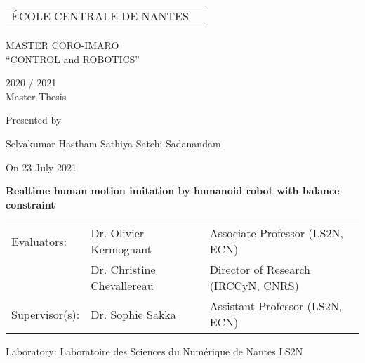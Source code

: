 \thispagestyle{empty}

\def\lskip{\vspace{0.5cm}}


\begin{tabular}{p{7cm}p{8cm}}
ÉCOLE CENTRALE DE NANTES
&
\end{tabular}

\vspace{2cm}

\begin{center} \large\sc MASTER CORO-IMARO\\ \normalsize{``CONTROL and ROBOTICS''} \end{center}



\begin{center}
	2020 / 2021\\
	\lskip
	Master Thesis %
	\lskip
	
	Presented by \lskip 
	
	Selvakumar Hastham Sathiya Satchi Sadanandam \lskip
	
	On 23 July 2021 \lskip\lskip
	
	{\Large \textbf{Realtime human motion imitation by humanoid robot with balance constraint}}
	
	\vfill

		
	\end{center}
	


\begin{tabular}{p{3cm}p{5cm}p{7cm} }
 Evaluators: & Dr. Olivier Kermognant & Associate Professor (LS2N, ECN) \\
	      & Dr. Christine Chevallereau & Director of Research (IRCCyN, CNRS) \\ 
  Supervisor(s):  & Dr. Sophie Sakka & Assistant Professor (LS2N, ECN) \\
\end{tabular}

\lskip

\begin{flushleft}
 Laboratory: Laboratoire des Sciences du Numérique de Nantes LS2N
\end{flushleft}

\newpage
\thispagestyle{empty}
\null
\newpage
\addtocounter{page}{-1}
\pagestyle{fancy}
